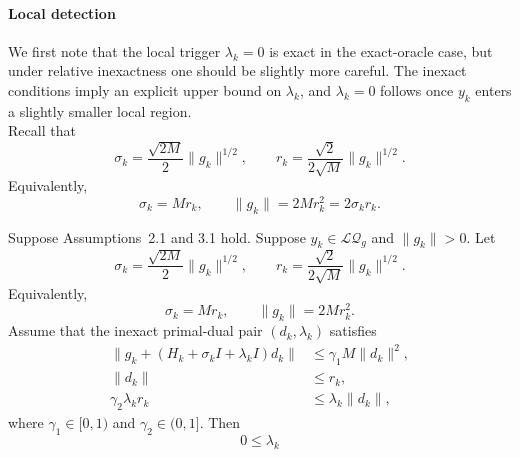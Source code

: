 \begin{itemize}
{              \paragraph{Local detection} We first note that the local trigger \(\lambda_k=0\) is exact in the
              exact-oracle case, but under relative inexactness one should be slightly
              more careful. The inexact conditions imply an explicit upper bound on
              \(\lambda_k\), and \(\lambda_k=0\) follows once \(y_k\) enters a slightly
              smaller local region.\\
              Recall that
              \[
                  \sigma_k=\frac{\sqrt{2M}}{2}\|g_k\|^{1/2},
                  \qquad
                  r_k=\frac{\sqrt{2}}{2\sqrt M}\|g_k\|^{1/2}.
              \]
              Equivalently,
              \[
                  \sigma_k=Mr_k,
                  \qquad
                  \|g_k\|=2Mr_k^2=2\sigma_k r_k.
              \]
              \begin{lemma}
                  \label{lem.inexact-lambda-local-upper}
                  Suppose Assumptions~2.1 and 3.1 hold. Suppose \(y_k\in\mathcal{LQ}_g\) and \(\|g_k\|>0\). Let
                  \[
                      \sigma_k=\frac{\sqrt{2M}}{2}\|g_k\|^{1/2},
                      \qquad
                      r_k=\frac{\sqrt 2}{2\sqrt M}\|g_k\|^{1/2}.
                  \]
                  Equivalently,
                  \[
                      \sigma_k=Mr_k,
                      \qquad
                      \|g_k\|=2Mr_k^2.
                  \]
                  Assume that the inexact primal-dual pair \((d_k,\lambda_k)\) satisfies
                  \begin{align}
                      \label{eq.opt-inexact-fo-local}
                      \|g_k+(H_k+\sigma_k I+\lambda_k I)d_k\|
                       & \leq \gamma_1 M\|d_k\|^2, \\
                      \label{eq.opt-inexact-primal-local}
                      \|d_k\|
                       & \leq r_k,                 \\
                      \label{eq.opt-inexact-cs-local}
                      \gamma_2\lambda_k r_k
                       & \leq \lambda_k \|d_k\|,
                  \end{align}
                  where \(\gamma_1\in[0,1)\) and \(\gamma_2\in(0,1]\). Then
                  \begin{equation}
                      \label{eq.lambda-local-upper-simple}
                      0\le \lambda_k

\end{equation}
\end{lemma}}
\end{itemize}
